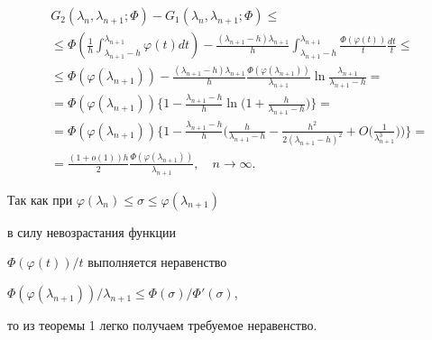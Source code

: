 \begin{align*}


&G_2(\lambda_n,\lambda_{n+1};\Phi)-G_1(\lambda_n,\lambda_{n+1};\Phi)\le\\


&\le\Phi(\frac{1}{h}\int_{\lambda_{n+1}-h}^{\lambda_{n+1}}\varphi(t)dt)- 


\frac{(\lambda_{n+1}-h)\lambda_{n+1}}{h}


\int_{\lambda_{n+1}-h}^{\lambda_{n+1}}


\frac{\Phi(\varphi(t))}{t}\frac{dt}{t}\le\\


&\le\Phi(\varphi(\lambda_{n+1}))-\frac{(\lambda_{n+1}-h)\lambda_{n+1}}{h}


\frac{\Phi(\varphi(\lambda_{n+1}))}{\lambda_{n+1}}


\ln\frac{\lambda_{n+1}}{\lambda_{n+1}-h}=\\


&=\Phi(\varphi(\lambda_{n+1}))\bigg\{1-\frac{\lambda_{n+1}-h}{h}


\ln\bigg(1+\frac{h}{\lambda_{n+1}-h}\bigg)\bigg\}=\\


&=\Phi(\varphi(\lambda_{n+1}))\bigg\{1-\frac{\lambda_{n+1}-h}{h}


\bigg(\frac{h}{\lambda_{n+1}-h}-\frac{h^2}{2(\lambda_{n+1}-h)^2}+


O\bigg(\frac{1}{\lambda_{n+1}^3}\bigg)\bigg)\bigg\}=\\


&=\frac{(1+o(1))h}{2}\frac{\Phi(\varphi(\lambda_{n+1}))}{\lambda_{n+1}},


\quad n\to\infty.


\end{align*}


Так как при $\varphi(\lambda_n)\le\sigma\le\varphi(\lambda_{n+1})$


в силу невозрастания функции 


$\Phi(\varphi(t))/t$ выполняется неравенство


$\Phi(\varphi(\lambda_{n+1}))/\lambda_{n+1}\le


\Phi(\sigma)/\Phi'(\sigma)$,


то из теоремы 1 легко получаем требуемое неравенство.








